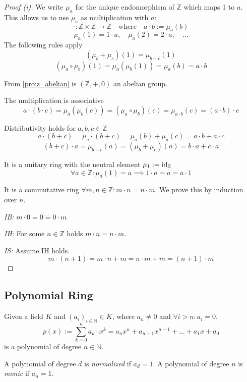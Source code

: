 \begin{proof}[Proof (i)]
   We write \(\mu_a\) for the unique endomorphism of \(\mathbb{Z}\) which maps 1 to \(a\).
   This allows us to use \(\mu_a\) as multiplication with \(a\):
   \[\cdot: \mathbb{Z} \times \mathbb{Z} \to \mathbb{Z} \quad\text{where}\quad a \cdot b := \mu_a(b)\]
   \[\mu_a(1) = 1 \cdot a, \quad \mu_a(2) = 2 \cdot a, \quad\ldots\]
   The following rules apply
   \[(\mu_b + \mu_c)(1) = \mu_{b + c}(1)\]
   \[(\mu_a \circ \mu_b)(1) = \mu_a(\mu_b(1)) = \mu_a(b) = a \cdot b\]

   From \cref{pro:z_abelian} is \((\mathbb{Z}, +, 0)\) an abelian group.

   The multiplication is associative
   \[a \cdot (b \cdot c) = \mu_a(\mu_b(c)) = (\mu_a \circ \mu_b)(c) = \mu_{a \cdot b}(c) = (a \cdot b) \cdot c\]

   Distributivity holds for \(a, b, c \in \mathbb{Z}\)
   \[a \cdot (b + c) = \mu_a \cdot (b + c) = \mu_a(b) + \mu_a(c) = a \cdot b + a \cdot c\]
   \[(b + c) \cdot a = \mu_{b + c}(a) = (\mu_b + \mu_c)(a) = b \cdot a + c \cdot a\]

   It is a unitary ring with the neutral element \(\mu_1 := \operatorname{id}_{\mathbb{Z}}\)
   \[\forall a \in \mathbb{Z}: \mu_a(1) = a \implies 1 \cdot a = a = a \cdot 1\]

   It is a commutative ring \(\forall m, n \in \mathbb{Z}: m \cdot n = n \cdot m\).
   We prove this by induction over \(n\).

   \textit{IB:} \(m \cdot 0 = 0 = 0 \cdot m\)

   \textit{IH:} For some \(n \in \mathbb{Z}\) holds \(m \cdot n = n \cdot m\).

   \textit{IS:} Assume IH holds.
   \[m \cdot (n + 1) = m \cdot n + m = n \cdot m + m = (n + 1) \cdot m\]
\end{proof}

\subsection{Polynomial Ring}
\begin{definition}[Polynomial]
   Given a field \(K\) and \((a_i)_{i \in \mathbb{N}} \in K\), where \(a_n \neq 0\) and \(\forall i > n: a_i = 0\).
   \[p(x) := \sum_{k=0}^n a_k \cdot x^k = a_nx^n + a_{n-1}x^{n-1} + \ldots + a_1x + a_0\]
   is a polynomial of degree \(n \in \mathbb{N}\).
\end{definition}
\begin{remark}[Terminology]
   A polynomial of degree \(d\) is \emph{normalized} if \(a_d = 1\).
   A polynomial of degree \(n\) is \emph{monic} if \(a_n = 1\).
\end{remark}

